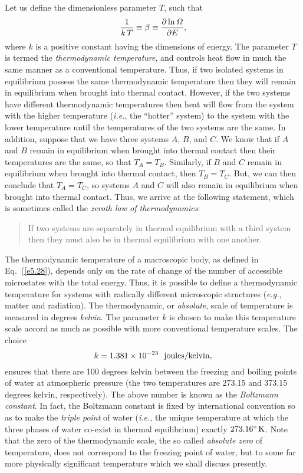 Let us define the dimensionless parameter $T$, such that
\begin{equation}\label{e5.28}
\frac{1}{k\,T} \equiv \beta \equiv \frac{\partial \ln{\mit\Omega}}{\partial E},
\end{equation}
where $k$ is a positive constant having the dimensions of energy. The parameter $T$
is termed the {\em thermodynamic temperature}, and controls heat flow in much the
same manner as a conventional temperature. Thus, if two isolated systems in
equilibrium possess the same thermodynamic temperature then they will remain in equilibrium
when brought into thermal contact. However, 
if the two systems have different thermodynamic  temperatures
then heat will flow from the system with the higher temperature 
({\em i.e.}, the ``hotter''
system) to the system with the lower temperature until the temperatures of the
two systems are the same. In addition, suppose that we have three systems $A$, $B$,
and $C$. We know that if $A$ and $B$ remain in equilibrium when brought into thermal
contact then their temperatures are the same, so that $T_A= T_B$. Similarly, if 
$B$ and $C$ remain in equilibrium when brought into thermal contact, then
$T_B = T_C$. But, we can then conclude that $T_A=T_C$, so systems $A$ and $C$
will also remain in equilibrium when brought into thermal contact. Thus, we arrive at
the following statement, which is sometimes called the {\em zeroth law of
thermodynamics}:
\begin{quote}
{\sf If two systems are separately in thermal equilibrium with a third system 
then they must also be
in thermal equilibrium with one another.}
\end{quote}

The thermodynamic temperature of a macroscopic body, as defined in Eq.~(\ref{e5.28}), 
depends 
only on  the rate of change of
the number of accessible microstates  with the total energy. Thus, it is possible
to define   a thermodynamic 
temperature for systems with radically different microscopic
structures ({\em e.g.}, matter and radiation).
The thermodynamic, or {\em absolute}, scale of temperature is measured in
degrees {\em kelvin}.
The parameter $k$ is chosen to make this temperature scale 
accord as much as possible
with more conventional  temperature scales. The choice
\begin{equation}
k = 1.381\times 10^{-23}~~{\rm joules / kelvin},
\end{equation}
ensures that there are  100 degrees kelvin  between the freezing and boiling points
of water at atmospheric pressure (the two temperatures are 
273.15 and 373.15 degrees kelvin, respectively). 
The above number is known as the {\em Boltzmann
constant}.  In fact, the Boltzmann constant is fixed  by international
convention so as to make the {\em triple point}\/ of water ({\em i.e.}, the unique
temperature at which the three phases of water co-exist in thermal equilibrium)
exactly $273.16^\circ\,{\rm K}$. Note that the zero of the thermodynamic scale, the
so called {\em absolute zero}\/ of temperature, does not correspond to the freezing
point of water,  but to some far more physically significant temperature which we
shall discuss presently.

